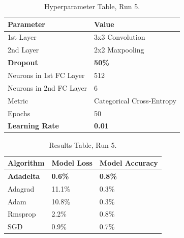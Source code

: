 \documentclass[report, 11pt, oneside]{dissertation}
\begin{document}
\begin{table}[H]
\centering
	\begin{tabular}{|l|l|}
		\hline
		Parameter               			& Value                     \\ \hline
		1st Layer               			& 3x3 Convolution           \\ \hline
		2nd Layer               			& 2x2 Maxpooling            \\ \hline
		\textbf{Dropout}        			& \textbf{50\%}             \\ \hline
		Neurons in 1st FC Layer 			& 512                       \\ \hline
		Neurons in 2nd FC Layer 			& 6                         \\ \hline
		Metric                  			& Categorical Cross-Entropy \\ \hline
		Epochs                  			& 50                        \\ \hline
		\textbf{Learning Rate}\footnote[1]  & \textbf{0.01}             \\ \hline
	\end{tabular}
	\caption{Hyperparameter Table, Run 5.}
	\label{tab:parameters_5}
\end{table}

\begin{table}[H]
	\centering
	\begin{tabular}{|l|l|l|}
	\hline
		Algorithm            & Model Loss     & Model Accuracy \\ \hline
		\textbf{Adadelta}    & \textbf{0.6\%} & \textbf{0.8\%} \\ \hline
		Adagrad              & 11.1\%         & 0.3\%          \\ \hline
		Adam                 & 10.8\%         & 0.3\%          \\ \hline
		Rmsprop              & 2.2\%          & 0.8\%          \\ \hline
		SGD\footnote[1] 	 & 0.9\%          & 0.7\%          \\ \hline
		\end{tabular}
	\caption{Results Table, Run 5.}
	\label{tab:results_5}
\end{table}

\ \
\end{document}
